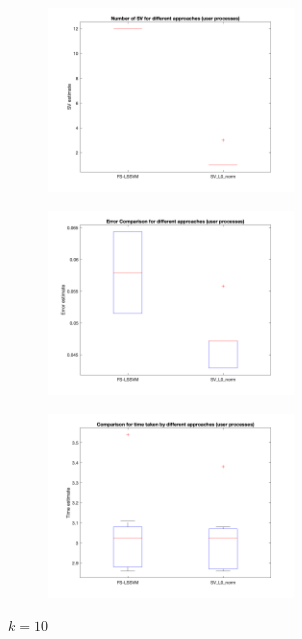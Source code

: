 \documentclass[a4paper, 11pt, one column]{article}
\begin{document}
\begin{figure}[H]
    \centering
        \begin{subfigure}{0.33\textwidth}
            \includegraphics[width=6.5cm]{images/comp_SV_k=10_shuttle.png}
            \label{fig:1}
        \end{subfigure}\hfil
        \begin{subfigure}{0.33\textwidth}
            \includegraphics[width=6.5cm]{images/comp_error_k=10_shuttle.png}
            \label{fig:2}
        \end{subfigure}\hfil
        \begin{subfigure}{0.33\textwidth}
            \includegraphics[width=6.5cm]{images/comp_time_k=10_shuttle.png}
            \label{fig:3}
        \end{subfigure}\hfil
        \caption{$k = 10$}
        \label{fig:comparisonL0332}


\end{figure}
\end{document}
